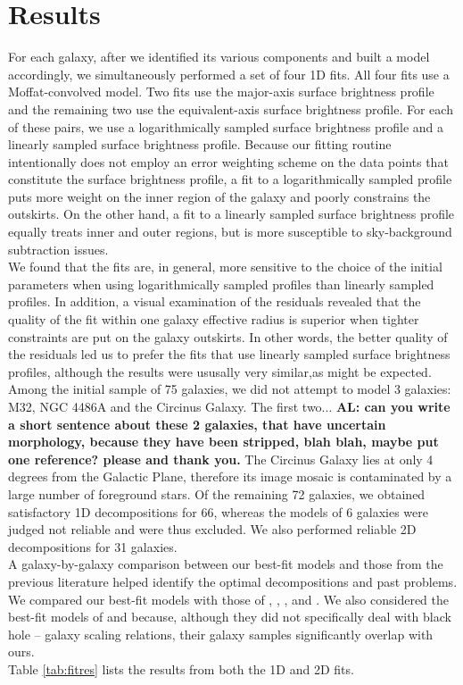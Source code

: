 \documentclass[preprint2]{emulateapj}
\begin{document}
\section{Results}
\label{sec:res}
For each galaxy, after we identified its various components and built a model accordingly, 
we simultaneously performed a set of four 1D fits.
All four fits use a Moffat-convolved model.
Two fits use the major-axis surface brightness profile and the remaining two use the equivalent-axis surface brightness profile. 
For each of these pairs, we use a logarithmically sampled surface brightness profile 
and a linearly sampled surface brightness profile. 
Because our fitting routine intentionally does not employ an error weighting scheme on the data points that constitute the surface brightness profile, 
a fit to a logarithmically sampled profile puts more weight on the inner region of the galaxy 
and poorly constrains the outskirts.
On the other hand, a fit to a linearly sampled surface brightness profile equally treats inner and outer regions, 
but is more susceptible to sky-background subtraction issues. \\ 
We found that the fits are, in general, more sensitive to the choice of the initial parameters 
when using logarithmically sampled profiles than linearly sampled profiles. 
In addition, a visual examination of the residuals revealed that the quality of the fit within one galaxy effective radius 
is superior when tighter constraints are put on the galaxy outskirts.
In other words, the better quality of the residuals led us to prefer the fits that use linearly sampled surface brightness profiles,
although the results were ususally very similar,as might be expected. \\
Among the initial sample of 75 galaxies, we did not attempt to model 3 galaxies: M32, NGC 4486A and the Circinus Galaxy. 
The first two... {\bf AL: can you write a short sentence about these 2 galaxies, that have uncertain morphology,
because they have been stripped, blah blah, maybe put one reference? please and thank you.}
The Circinus Galaxy lies at only 4 degrees from the Galactic Plane, 
therefore its image mosaic is contaminated by a large number of foreground stars.
Of the remaining 72 galaxies, 
we obtained satisfactory 1D decompositions for 66, 
whereas the models of 6 galaxies were judged not reliable and were thus excluded. 
We also performed reliable 2D decompositions for 31 galaxies. \\
A galaxy-by-galaxy comparison between our best-fit models and those from the previous literature 
helped identify the optimal decompositions and past problems. 
We compared our best-fit models with those of \cite{grahamdriver2007}, \cite{sani2011}, \cite{beifiori2012}, 
\cite{vika2012} and \cite{lasker2014data}. 
We also considered the best-fit models of \cite{laurikainen2010} and \cite{rusli2013} because,   
although they did not specifically deal with black hole -- galaxy scaling relations, 
their galaxy samples significantly overlap with ours. \\
Table \ref{tab:fitres} lists the results from both the 1D and 2D fits.
\end{document}
